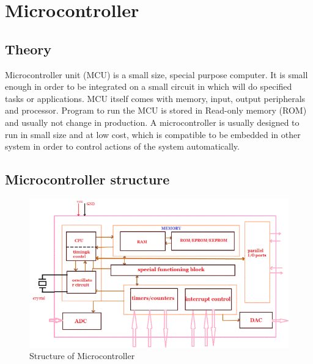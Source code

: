 
\section{Microcontroller}
  \subsection{Theory}
  Microcontroller unit (MCU) is a small size, special purpose computer. It is small enough in order to be integrated on a small circuit in which will do specified tasks or applications. MCU itself comes with memory, input, output peripherals and processor. Program to run the MCU is stored in Read-only memory (ROM) and usually not change in production. A microcontroller is usually designed to run in small size and at low cost, which is compatible to be embedded in other system in order to control actions of the system automatically.

  \subsection{Microcontroller structure}
  
  \begin{figure}[h!]
    \includegraphics[scale=0.9]{images/Microcontroller-Structure.png}
    \caption{Structure of Microcontroller}
  \end{figure}
  


